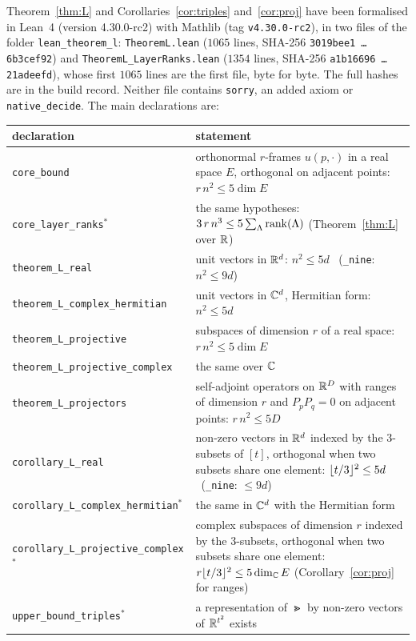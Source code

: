 Theorem~\ref{thm:L} and Corollaries~\ref{cor:triples} and~\ref{cor:proj} have been formalised in Lean~4 (version
4.30.0-rc2) with Mathlib (tag \texttt{v4.30.0-rc2}), in two files of the folder \texttt{lean\_theorem\_l}:
\texttt{TheoremL.lean} ($1065$ lines, SHA-256 \texttt{3019bee1\,\dots\,6b3cef92}) and
\texttt{TheoremL\_LayerRanks.lean} ($1354$ lines, SHA-256 \texttt{a1b16696\,\dots\,21adeefd}), whose first
$1065$ lines are the first file, byte for byte. The full hashes are in the build record. Neither file contains
\texttt{sorry}, an added axiom or \texttt{native\_decide}. The main declarations are:
\begin{center}\small
\begin{tabular}{@{}p{}p{}@{}}
\toprule
declaration & statement\\
\midrule
\texttt{core\_bound} & orthonormal $r$-frames $u(p,\cdot)$ in a real space $E$, orthogonal on adjacent
points: $r\,n^2\le5\dim E$\\
\texttt{core\_layer\_ranks}$^{\ast}$ & the same hypotheses: $3\,r\,n^3\le5\sum_\Lambda\operatorname{rank}(\Lambda)$
(Theorem~\ref{thm:L} over $\mathbb{R}$)\\
\texttt{theorem\_L\_real} & unit vectors in $\mathbb{R}^d$: $n^2\le5d$ \ (\texttt{\_nine}: $n^2\le9d$)\\
\texttt{theorem\_L\_complex\_hermitian} & unit vectors in $\mathbb{C}^d$, Hermitian form: $n^2\le5d$\\
\texttt{theorem\_L\_projective} & subspaces of dimension $r$ of a real space: $r\,n^2\le5\dim E$\\
\texttt{theorem\_L\_projective\_complex} & the same over $\mathbb{C}$\\
\texttt{theorem\_L\_projectors} & self-adjoint operators on $\mathbb{R}^D$ with ranges of dimension $r$ and
$P_pP_q=0$ on adjacent points: $r\,n^2\le5D$\\
\texttt{corollary\_L\_real} & non-zero vectors in $\mathbb{R}^d$ indexed by the $3$-subsets of $[t]$, orthogonal
when two subsets share one element: $\lfloor t/3\rfloor^2\le5d$ \ (\texttt{\_nine}: $\le9d$)\\
\texttt{corollary\_L\_complex\_hermitian}$^{\ast}$ & the same in $\mathbb{C}^d$ with the Hermitian form\\
\texttt{corollary\_L\_projective\_complex}$^{\ast}$ & complex subspaces of dimension $r$ indexed by the
$3$-subsets, orthogonal when two subsets share one element: $r\lfloor t/3\rfloor^2\le5\dim_{\mathbb{C}} E$
(Corollary~\ref{cor:proj} for ranges)\\
\texttt{upper\_bound\_triples}$^{\ast}$ & a representation of $\Gt$ by non-zero vectors of $\mathbb{R}^{t^2}$ exists\\
\bottomrule
\end{tabular}
\end{center}
